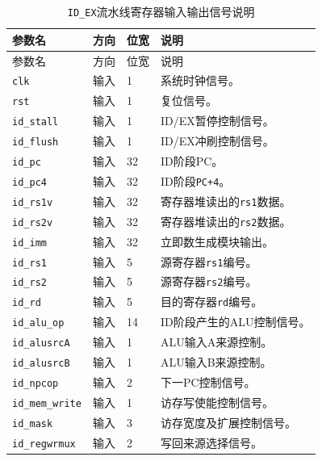 \documentclass[12pt,a4paper]{ctexart}
\newcommand{\code}[1]{\texttt{#1}}
\begin{document}
{\footnotesize
\renewcommand{\arraystretch}{1.12}
\begin{longtable}{p{3.2cm}p{1.5cm}p{2.1cm}p{7.0cm}}
	\caption{\code{ID\_EX}流水线寄存器输入输出信号说明}                  \\
	\toprule
	参数名                   & 方向 & 位宽 & 说明                   \\
	\midrule
	\endfirsthead
	\toprule
	参数名                   & 方向 & 位宽 & 说明                   \\
	\midrule
	\endhead
	\code{clk}            & 输入 & 1  & 系统时钟信号。              \\
	\code{rst}            & 输入 & 1  & 复位信号。                \\
	\code{id\_stall}      & 输入 & 1  & ID/EX暂停控制信号。         \\
	\code{id\_flush}      & 输入 & 1  & ID/EX冲刷控制信号。         \\
	\code{id\_pc}         & 输入 & 32 & ID阶段PC。              \\
	\code{id\_pc4}        & 输入 & 32 & ID阶段\code{PC+4}。     \\
	\code{id\_rs1v}       & 输入 & 32 & 寄存器堆读出的\code{rs1}数据。 \\
	\code{id\_rs2v}       & 输入 & 32 & 寄存器堆读出的\code{rs2}数据。 \\
	\code{id\_imm}        & 输入 & 32 & 立即数生成模块输出。           \\
	\code{id\_rs1}        & 输入 & 5  & 源寄存器\code{rs1}编号。    \\
	\code{id\_rs2}        & 输入 & 5  & 源寄存器\code{rs2}编号。    \\
	\code{id\_rd}         & 输入 & 5  & 目的寄存器\code{rd}编号。    \\
	\code{id\_alu\_op}    & 输入 & 14 & ID阶段产生的ALU控制信号。      \\
	\code{id\_alusrcA}    & 输入 & 1  & ALU输入A来源控制。          \\
	\code{id\_alusrcB}    & 输入 & 1  & ALU输入B来源控制。          \\
	\code{id\_npcop}      & 输入 & 2  & 下一PC控制信号。            \\
	\code{id\_mem\_write} & 输入 & 1  & 访存写使能控制信号。           \\
	\code{id\_mask}       & 输入 & 3  & 访存宽度及扩展控制信号。         \\
	\code{id\_regwrmux}   & 输入 & 2  & 写回来源选择信号。            \\

\end{longtable}}
\end{document}
